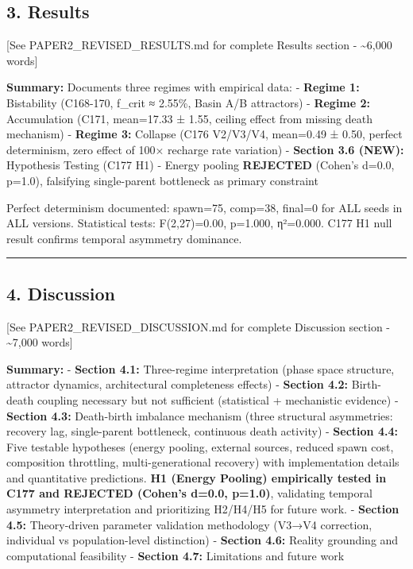 \documentclass[
]{article}
\begin{document}
\subsection{3. Results}\label{results}

{[}See PAPER2\_REVISED\_RESULTS.md for complete Results section -
\textasciitilde6,000 words{]}

\textbf{Summary:} Documents three regimes with empirical data: -
\textbf{Regime 1:} Bistability (C168-170, f\_crit ≈ 2.55\%, Basin A/B
attractors) - \textbf{Regime 2:} Accumulation (C171, mean=17.33 ± 1.55,
ceiling effect from missing death mechanism) - \textbf{Regime 3:}
Collapse (C176 V2/V3/V4, mean=0.49 ± 0.50, perfect determinism, zero
effect of 100× recharge rate variation) - \textbf{Section 3.6 (NEW):}
Hypothesis Testing (C177 H1) - Energy pooling \textbf{REJECTED} (Cohen's
d=0.0, p=1.0), falsifying single-parent bottleneck as primary constraint

Perfect determinism documented: spawn=75, comp=38, final=0 for ALL seeds
in ALL versions. Statistical tests: F(2,27)=0.00, p=1.000, η²=0.000.
C177 H1 null result confirms temporal asymmetry dominance.

\begin{center}\rule{0.5\linewidth}{0.5pt}\end{center}

\subsection{4. Discussion}\label{discussion}

{[}See PAPER2\_REVISED\_DISCUSSION.md for complete Discussion section -
\textasciitilde7,000 words{]}

\textbf{Summary:} - \textbf{Section 4.1:} Three-regime interpretation
(phase space structure, attractor dynamics, architectural completeness
effects) - \textbf{Section 4.2:} Birth-death coupling necessary but not
sufficient (statistical + mechanistic evidence) - \textbf{Section 4.3:}
Death-birth imbalance mechanism (three structural asymmetries: recovery
lag, single-parent bottleneck, continuous death activity) -
\textbf{Section 4.4:} Five testable hypotheses (energy pooling, external
sources, reduced spawn cost, composition throttling, multi-generational
recovery) with implementation details and quantitative predictions.
\textbf{H1 (Energy Pooling) empirically tested in C177 and REJECTED
(Cohen's d=0.0, p=1.0)}, validating temporal asymmetry interpretation
and prioritizing H2/H4/H5 for future work. - \textbf{Section 4.5:}
Theory-driven parameter validation methodology (V3→V4 correction,
individual vs population-level distinction) - \textbf{Section 4.6:}
Reality grounding and computational feasibility - \textbf{Section 4.7:}
Limitations and future work
\end{document}
